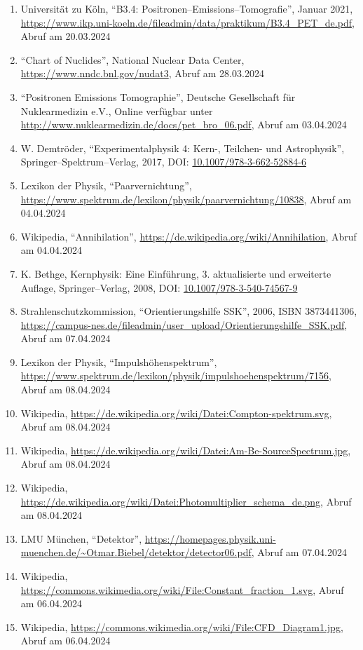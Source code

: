 \documentclass[12pt,a4paper]{scrartcl}
\numberwithin{equation}{section} %
\renewcommand{\[}{} %
\renewcommand{\]}{\noindent} %
\newcommand{\tightlist}{} %
\begin{document}
\begin{enumerate}
\def\labelenumi{\arabic{enumi}.}
\tightlist
\item
  Universität zu Köln, ``B3.4: Positronen--Emissions--Tomografie'',
  Januar 2021,
  \url{https://www.ikp.uni-koeln.de/fileadmin/data/praktikum/B3.4\_PET\_de.pdf},
  Abruf am 20.03.2024
\item
  ``Chart of Nuclides'', National Nuclear Data Center,
  \url{https://www.nndc.bnl.gov/nudat3}, Abruf am 28.03.2024
\item
  ``Positronen Emissions Tomographie'', Deutsche Gesellschaft für
  Nuklearmedizin e.V., Online verfügbar unter
  \url{http://www.nuklearmedizin.de/docs/pet_bro_06.pdf}, Abruf am
  03.04.2024
\item
  W. Demtröder, ``Experimentalphysik 4: Kern-, Teilchen- und
  Astrophysik'', Springer--Spektrum--Verlag, 2017, DOI:
  \href{https://link.springer.com/book/10.1007/978-3-662-52884-6}{10.1007/978-3-662-52884-6}
\item
  Lexikon der Physik, ``Paarvernichtung'',
  \url{https://www.spektrum.de/lexikon/physik/paarvernichtung/10838},
  Abruf am 04.04.2024
\item
  Wikipedia, ``Annihilation'',
  \url{https://de.wikipedia.org/wiki/Annihilation}, Abruf am 04.04.2024
\item
  K. Bethge, Kernphysik: Eine Einführung, 3. aktualisierte und
  erweiterte Auflage, Springer--Verlag, 2008, DOI:
  \href{https://doi.org/10.1007/978-3-540-74567-9}{10.1007/978-3-540-74567-9}
\item
  Strahlenschutzkommission, ``Orientierungshilfe SSK'', 2006, ISBN 3873441306,
  \url{https://campus-nes.de/fileadmin/user_upload/Orientierungshilfe_SSK.pdf}, Abruf am 07.04.2024
\item
  Lexikon der Physik, ``Impulshöhenspektrum'',
  \url{https://www.spektrum.de/lexikon/physik/impulshoehenspektrum/7156},
  Abruf am 08.04.2024
\item
  Wikipedia,
  \url{https://de.wikipedia.org/wiki/Datei:Compton-spektrum.svg},
  Abruf am 08.04.2024
\item
  Wikipedia,
  \url{https://de.wikipedia.org/wiki/Datei:Am-Be-SourceSpectrum.jpg},
  Abruf am 08.04.2024
\item
  Wikipedia,
  \url{https://de.wikipedia.org/wiki/Datei:Photomultiplier_schema_de.png},
  Abruf am 08.04.2024
\item
  LMU München, ``Detektor'',
  \url{https://homepages.physik.uni-muenchen.de/~Otmar.Biebel/detektor/detector06.pdf},
  Abruf am 07.04.2024
\item
  Wikipedia,
  \url{https://commons.wikimedia.org/wiki/File:Constant_fraction_1.svg},
  Abruf am 06.04.2024
\item
  Wikipedia,
  \url{https://commons.wikimedia.org/wiki/File:CFD_Diagram1.jpg},
  Abruf am 06.04.2024
\end{enumerate}
\end{document}
